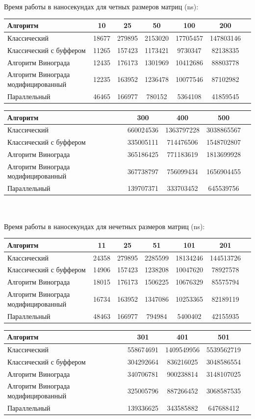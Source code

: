 \documentclass[utf8x, 12pt]{G7-32} %
\begin{document}
Время работы в наносекундах для четных размеров матриц (ns):\\
\begin{tabular}{l*{5}{c}r}
	Алгоритм & 10 & 25 & 50 & 100 & 200 \\
	\hline
	Классический & 18677 & 279895 & 2153020 & 17705457 & 147803146 \\
	Классический с буффером & 11265 & 157423 & 1173421 & 9730347 & 82138335 \\
	Алгоритм Винограда & 12435 & 176173 & 1301969 & 10412686 & 88803778 \\
	Алгоритм Винограда модифицированный & 12235 & 163952 & 1236478 & 10077546 & 87102982 \\
	Параллельный & 46465 & 166977 & 780152 & 5364108 & 41859545 \\
\end{tabular}
\begin{tabular}{l*{3}{c}r}
	Алгоритм & 300 & 400 & 500 \\
	\hline
	Классический & 660024536 & 1363797228 & 3038865567 \\
	Классический с буффером & 335005111 & 714476506 & 1548702807 \\
	Алгоритм Винограда & 365186425 & 771183619 & 1813699928 \\
	Алгоритм Винограда модифицированный & 367738797 & 756099434 & 1656904455 \\
	Параллельный & 139707371 & 333703452 & 645539756 \\
\end{tabular}
\\
\\

Время работы в наносекундах для нечетных размеров матриц (ns):\\
\begin{tabular}{l*{5}{c}r}
	Алгоритм & 11 & 25 & 51 & 101 & 201 \\
	\hline
	Классический & 24358 & 279895 & 2285599 & 18134246 & 144513726 \\
	Классический с буффером & 14906 & 157423 & 1238208 & 10047620 & 78927578 \\
	Алгоритм Винограда & 18015 & 176173 & 1506225 & 10676329 & 85575794 \\
	Алгоритм Винограда модифицированный & 16734 & 163952 & 1347086 & 10253365 & 82189119 \\
	Параллельный & 48463 & 166977 & 794984 & 5400402 & 42155935 \\
\end{tabular}
\begin{tabular}{l*{3}{c}r}
	Алгоритм & 301 & 401 & 501 \\
	\hline
	Классический & 558674691 & 1409549956 & 5539562719 \\
	Классический с буффером & 304292664 & 836216025 & 3048586554 \\
	Алгоритм Винограда & 340706781 & 900238814 & 3148107025 \\
	Алгоритм Винограда модифицированный & 325005796 & 887266452 & 3068587535 \\
	Параллельный & 139336625 & 343585882 & 647688412 \\
\end{tabular}
\end{document}
